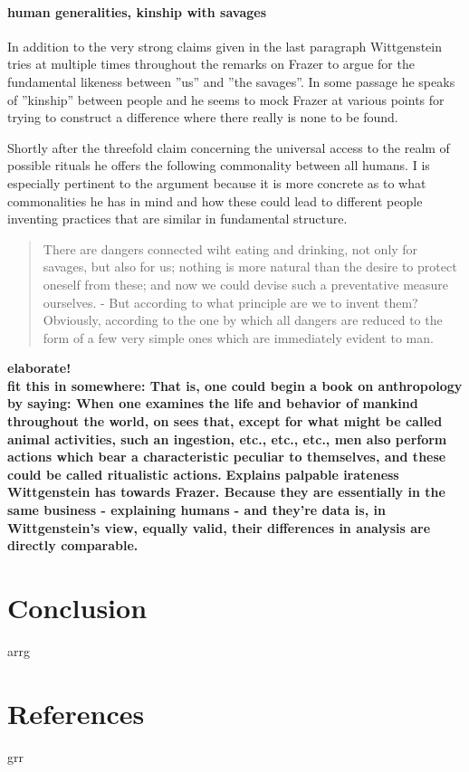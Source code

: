 \documentclass{article}
\begin{document}
\paragraph{human generalities, kinship with savages}
In addition to the very strong claims given in the last paragraph Wittgenstein tries at multiple times throughout the remarks on Frazer to argue for the fundamental likeness between ''us'' and ''the savages''. In some passage he speaks of ''kinship'' between people and he seems to mock Frazer at various points for trying to construct a difference where there really is none to be found. 

Shortly after the threefold claim concerning the universal access to the realm of possible rituals he offers the following commonality between all humans. I is especially pertinent to the argument because it is more concrete as to what commonalities he has in mind and how these could lead to different people inventing practices that are similar in fundamental structure.
\begin{quote}
There are dangers connected wiht eating and drinking, not only for savages, but also for us; nothing is more natural than the desire to protect oneself from these; and now we could devise such a preventative measure ourselves. - But according to what principle are we to invent them? Obviously, according to the one by which all dangers are reduced to the form of a few very simple ones which are immediately evident to man.
\end{quote}
\textbf{elaborate!\\ 
fit this in somewhere: That is, one could begin a book on anthropology by saying: When one examines the life and behavior of mankind throughout the world, on sees that, except for what might be called animal activities, such an ingestion, etc., etc., etc., men also perform actions which bear a characteristic peculiar to themselves, and these could be called ritualistic actions.}
\textbf{Explains palpable irateness Wittgenstein has towards Frazer. Because they are essentially in the same business - explaining humans - and they're data is, in Wittgenstein's view, equally valid, their differences in analysis are directly comparable.}

\section{Conclusion}
\hypertarget{sec4}{arrg}
\section{References}
\hypertarget{sec5}{grr}
\end{document}
